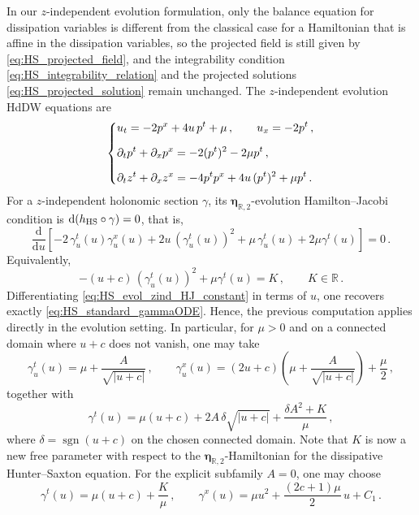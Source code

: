 \documentclass[11pt,twoside]{article}
\theoremstyle{plain}
\theoremstyle{definition}
\theoremstyle{remark}
\newcommand{\dd}{\mathrm{d}}
\begin{document}
In our $z$-independent evolution formulation, only the balance equation for dissipation variables is different from the classical case for a Hamiltonian that is affine in the dissipation variables, so the projected field is still given by \eqref{eq:HS_projected_field}, and the integrability condition \eqref{eq:HS_integrability_relation} and the projected solutions \eqref{eq:HS_projected_solution} remain unchanged. The $z$-independent evolution HdDW equations are
\begin{equation}\label{eq:HS_evol_HdDW}
\begin{dcases}
u_t=-2p^x+4u\,p^t+\mu\,,\qquad u_x=-2p^t\,,\\[2mm]
\partial_t p^t+\partial_x p^x=-2(p^t)^2-2\mu p^t\,,\\[2mm]
\partial_t z^t+\partial_x z^x=-4p^t p^x+4u\,(p^t)^2+\mu p^t\,.
\end{dcases}
\end{equation}
For a $z$-independent holonomic section $\gamma$, its $\bm\eta_{\mathbb{R},2}$-evolution Hamilton--Jacobi condition is
\(
\dd(h_{\rm HS}\circ\gamma)=0
\),
that is,
\begin{equation}\label{eq:HS_evol_zind_HJ}
\frac{\dd}{\dd u}\left[-2\,\gamma_u^t(u)\gamma_u^x(u)+2u\,(\gamma_u^t(u))^2+\mu\,\gamma_u^t(u)+2\mu \gamma^t(u)\right]=0\,.
\end{equation}
Equivalently,
\begin{equation}\label{eq:HS_evol_zind_HJ_constant}
-(u+c)\,(\gamma_u^t(u))^2+\mu \gamma^t(u)=K\,,
\qquad K\in\mathbb R\,.
\end{equation}
Differentiating \eqref{eq:HS_evol_zind_HJ_constant} in terms of $u$, one recovers exactly \eqref{eq:HS_standard_gammaODE}. Hence, the previous computation applies directly in the evolution setting. In particular, for $\mu>0$ and on a connected domain where $u+c$ does not vanish, one may take
\[
\gamma_u^t(u)=\mu+\frac{A}{\sqrt{|u+c|}}\,,\qquad
\gamma_u^x(u)=(2u+c)\left(\mu+\frac{A}{\sqrt{|u+c|}}\right)+\frac{\mu}{2}\,,
\]
together with
\[
\gamma^t(u)=\mu(u+c)+2A\,\delta\sqrt{|u+c|}+\frac{\delta A^2+K}{\mu}\,,
\]
where $\delta=\operatorname{sgn}(u+c)$ on the chosen connected domain. Note that $K$ is now a new free parameter with respect to the ${\bm \eta}_{\mathbb{R},2}$-Hamiltonian for the dissipative Hunter--Saxton equation. For the explicit subfamily $A=0$, one may choose
\begin{equation}\label{eq:HS_evol_explicit_S}
\gamma^t(u)=\mu(u+c)+\frac{K}{\mu}\,,\qquad
\gamma^x(u)=\mu u^2+\frac{(2c+1)\mu}{2}\,u+C_1\,.
\end{equation}
\end{document}
